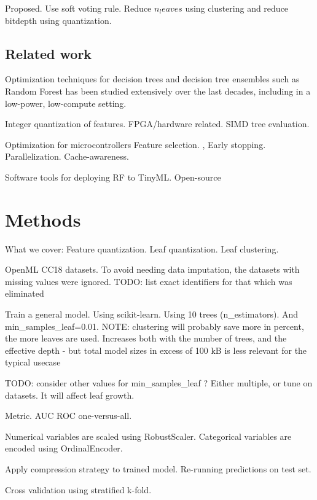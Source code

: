 \documentclass{article}
\begin{document}
Proposed. Use soft voting rule. Reduce $n_leaves$ using clustering and reduce bitdepth using quantization.

\subsection{Related work}

Optimization techniques for decision trees and decision tree ensembles such as Random Forest has been studied extensively over the last decades, including in a low-power, low-compute setting.

Integer quantization of features.
FPGA/hardware related.
SIMD tree evaluation.

Optimization for microcontrollers \cite{tabanelli_optimizing_2022}
Feature selection. \cite{uddin_guided_2015}, \cite{elsts_energy-efficient_2020}
Early stopping. \cite{daghero_low-overhead_2022} \cite{daghero_adaptive_2021}
Parallelization.
Cache-awareness.

Software tools for deploying RF to TinyML. Open-source


\section{Methods}
What we cover: Feature quantization. Leaf quantization. Leaf clustering.

OpenML CC18 datasets. \cite{oml-benchmarking-suites}
To avoid needing data imputation, the datasets with missing values were ignored.
TODO: list exact identifiers for that which was eliminated

Train a general model. Using scikit-learn. \cite{scikit-learn}
Using 10 trees ({n_estimators}). And {min_samples_leaf=0.01}.
NOTE: clustering will probably save more in percent, the more leaves are used.
Increases both with the number of trees, and the effective depth
- but total model sizes in excess of 100 kB is less relevant for the typical usecase

TODO: consider other values for {min_samples_leaf} ?
Either multiple, or tune on datasets.
It will affect leaf growth.

Metric. AUC ROC one-versus-all.

Numerical variables are scaled using RobustScaler.
Categorical variables are encoded using OrdinalEncoder.

Apply compression strategy to trained model. Re-running predictions on test set.

Cross validation using stratified k-fold.
\end{document}
